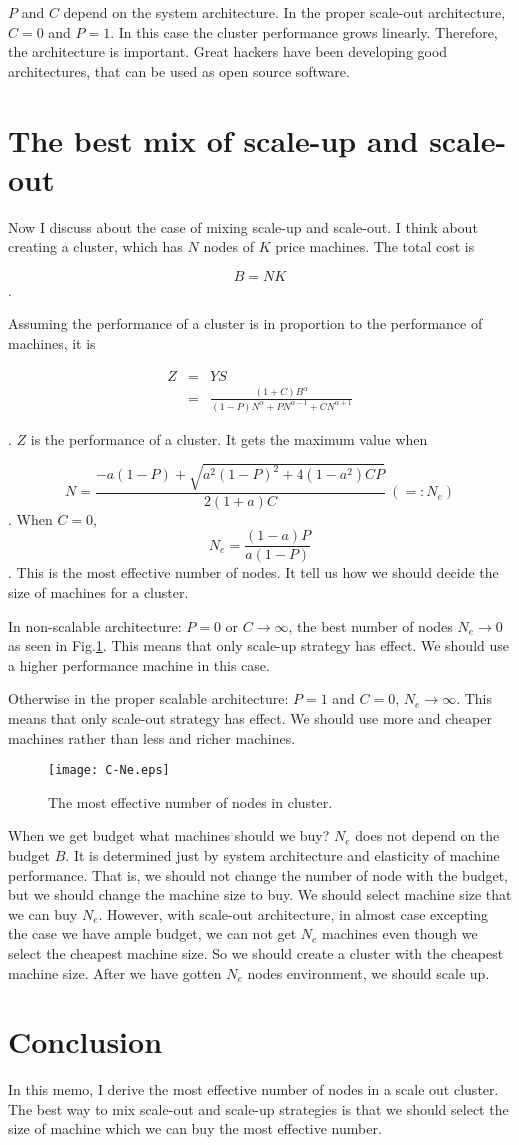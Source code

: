 \documentclass[a4paper,11pt]{article}
\begin{document}
$P$ and $C$ depend on the system architecture. In the proper scale-out architecture, $C = 0$ and $P = 1$.
In this case the cluster performance grows linearly.
Therefore, the architecture is important.
Great hackers have been developing good architectures,
that can be used as open source software.

\section{The best mix of scale-up and scale-out}

Now I discuss about the case of mixing scale-up and scale-out. I think about creating a cluster, which has $N$ nodes of $K$ price machines. The total cost is 

$$
B = NK
$$
.

Assuming the performance of a cluster is in proportion to the performance of machines, it is

\begin{eqnarray*}
Z &=& YS\\
  &=&\frac{(1 + C) B^\alpha}{(1-P) N^\alpha + P N^{\alpha-1} + C N^{\alpha + 1}}
\end{eqnarray*}

. $Z$ is the performance of a cluster. It gets the maximum value when

$$
N = \frac{-a(1-P)+\sqrt{a^2(1-P)^2 + 4(1-a^2)CP}}{2(1+a)C} ~ ( =: N_e)
$$
. When $C=0$,
$$
N_e = \frac{(1-a)P}{a(1-P)}
$$
. This is the most effective number of nodes. 
It tell us how we should decide the size of machines for a cluster. 

In non-scalable architecture: $P=0$ or $C \to \infty$, the best number of nodes 
$N_e \to 0$ as seen in Fig.\ref{C-Ne}. This means that only scale-up strategy has effect. We should use a higher performance machine in this case.

Otherwise in the proper scalable architecture: $P=1$ and $C = 0$, $N_e \to \infty$.
This means that only scale-out strategy has effect.
We should use more and cheaper machines rather than less and richer machines.

\begin{figure}
\begin{center}
\texttt{[image: C-Ne.eps]}
\caption{The most effective number of nodes in cluster.}
\label{C-Ne}
\end{center}
\end{figure}

When we get budget what machines should we buy?
$N_e$ does not depend on the budget $B$.
It is determined just by system architecture and elasticity of machine performance.
That is, we should not change the number of node with the budget,
but we should change the machine size to buy.
We should select machine size that we can buy $N_e$.
However, with scale-out architecture, in almost case excepting the case we have ample budget, we can not get $N_e$ machines even though we select the cheapest machine size.
So we should create a cluster with the cheapest machine size.
After we have gotten $N_e$ nodes environment, we should scale up.

\section{Conclusion}

In this memo, I derive the most effective number of nodes in a scale out cluster. The best way to mix scale-out and scale-up strategies is that we should select the size of machine which we can buy the most effective number.
\end{document}
